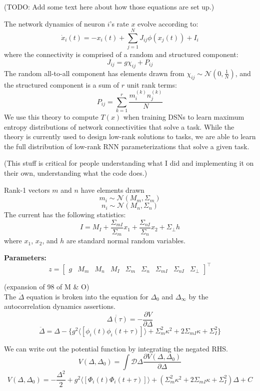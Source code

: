 \documentclass[11pt]{article}
\begin{document}
(TODO: Add some text here about how those equations are set up.)

The network dynamics of neuron $i$'s rate $x$ evolve according to:
\begin{equation}
\dot{x}_i(t) = -x_i(t) + \sum_{j=1}^N J_{ij} \phi(x_j(t)) + I_i 
\end{equation}
where the connectivity is comprised of a random and structured component:
\begin{equation}
J_{ij} = g \chi_{ij} + P_{ij}
\end{equation}
The random all-to-all component has elements drawn from
$\chi_{ij} \sim \mathcal{N}(0, \frac{1}{N})$, and the structured
component is a sum of $r$ unit rank terms:
\begin{equation}
P_{ij} = \sum_{k=1}^r \frac{m_i^{(k)}n_j^{(k)}}{N}
\end{equation}
We use this theory to compute $T(x)$ when training DSNs to learn maximum entropy distributions of network connectivities that solve a task.  While the theory is currently used to design low-rank solutions to tasks, we are able to learn the full distribution of low-rank RNN parameterizations that solve a given task.

(This stuff is critical for people understanding what I did and implementing it on their own, understanding what the code does.)

Rank-1 vectors $m$ and $n$ have elements drawn
\[m_i \sim \mathcal{N}(M_m, \Sigma_m)\]
\[n_i \sim \mathcal{N}(M_n, \Sigma_n)\]
The current has the following statistics:
\[I = M_I + \frac{\Sigma_{mI}}{\Sigma_m}x_1 + \frac{\Sigma_{nI}}{\Sigma_n}x_2 + \Sigma_\perp h\]
where $x_1$, $x_2$, and $h$ are standard normal random variables.

\textbf{Parameters:} \\
\[z = \begin{bmatrix} g & M_m & M_n & M_I & \Sigma_m & \Sigma_n & \Sigma_{mI} & \Sigma_{nI} & \Sigma_\perp \end{bmatrix}^\top \]

(expansion of 98 of M \& O) \\
The $\ddot{\Delta}$ equation is broken into the equation for $\Delta_0$ and $\Delta_\infty$ by the autocorrelation dynamics assertions.
\[\ddot{\Delta(\tau)} = - \frac{\partial V}{\partial \Delta} \]
\[\ddot{\Delta} = \Delta - \lbrace g^2 \langle \left[ \phi_i(t) \phi_i(t + \tau) \right] \rangle + \Sigma_m^2 \kappa^2 + 2\Sigma_{mI} \kappa + \Sigma_I^2 \rbrace \]

We can write out the potential function by integrating the negated RHS.
\[V(\Delta, \Delta_0) = \int \mathcal{D} \Delta \frac{\partial V(\Delta, \Delta_0)}{\partial \Delta}\]
\[V(\Delta, \Delta_0) = -\frac{\Delta^2}{2} + g^2 \langle \left[ \Phi_i(t) \Phi_i(t + \tau) \right] \rangle + (\Sigma_m^2 \kappa^2 + 2\Sigma_{mI} \kappa + \Sigma_I^2)\Delta + C \]
 
\end{document}
